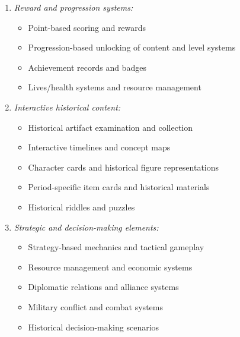\documentclass[a4paper,fleqn]{cas-sc}
\begin{document}
\begin{enumerate}[noitemsep]
	\item 
\textit{Reward and progression systems:}
\begin{itemize}[noitemsep]
 \item Point-based scoring and rewards \citep{4Cruz2017, 13Humpire2022, 23Zin2009322, 29Stiso20201165, 43ali2018indonesian, 52Lin2011265, 62Milosz201896, 64Hsu201324, 73Wolfartsberger2011160, 75trajano2014using, 78Rouse2022357, 79Fernes2024379}
 \item Progression-based unlocking of content and level systems \citep{13Humpire2022, 22Nugroho2020149, 23Zin2009322, 40Kuran2018, 77Ramansyah2021, 78Rouse2022357}
 \item Achievement records and badges \citep{71lynch2015pedagogical}
 \item Lives/health systems and resource management \citep{24Ghannem2019, 52Lin2011265, 55Squire2004, 75trajano2014using}
\end{itemize}

	\item 
\textit{Interactive historical content:}
\begin{itemize}[noitemsep]
 \item Historical artifact examination and collection \citep{1Barbatsis201159, 15Slater2022, 22Nugroho2020149, 48Moketar2021, 54Gibson2007, 58Shih2015173}
 \item Interactive timelines and concept maps \citep{11Ternblad2023115}
 \item Character cards and historical figure representations \citep{19Chou2019, 43ali2018indonesian, 47Clara2010156}
 \item Period-specific item cards and historical materials \citep{47Clara2010156}
 \item Historical riddles and puzzles \citep{6Czerwinski2018, 39Tegos2014838, 49Huizenga2007127, 69Wong2017150, 77Ramansyah2021}
\end{itemize}

	\item 
\textit{Strategic and decision-making elements:}
\begin{itemize}[noitemsep]
 \item Strategy-based mechanics and tactical gameplay \citep{3Watson2011466, 8Yu2014, 20Erandaru2014, 55Squire2004, 64Hsu201324, 65Razak201139, 74Fendt2019}
 \item Resource management and economic systems \citep{9Lin2018, 45Yu2016727, 48Moketar2021,  55Squire2004, 74Fendt2019, 75trajano2014using}
 \item Diplomatic relations and alliance systems \citep{8Yu2014, 55Squire2004, 74Fendt2019}
 \item Military conflict and combat systems \citep{8Yu2014, 18Shih201054, 20Erandaru2014, 24Ghannem2019, 64Hsu201324, 69Wong2017150, 74Fendt2019}
 \item Historical decision-making scenarios \citep{3Watson2011466, 20Erandaru2014, 29Stiso20201165, 60Hoy2018, 78Rouse2022357}
\end{itemize}


\end{enumerate}
\end{document}
